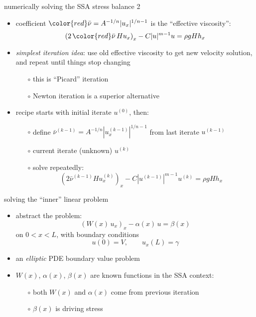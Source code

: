 \begin{frame}{numerically solving the SSA stress balance 2}

\begin{itemize}
\item coefficient ${\color{red} \bar \nu} = A^{-1/n} |u_x|^{1/n-1}$ is the ``effective viscosity'':
   $$\left(2 \,{\color{red} \bar \nu}\, H u_x\right)_x - C |u|^{m-1} u = \rho g H h_x$$

\medskip
\item \emph{simplest iteration idea}: use old effective viscosity to get new velocity solution, and repeat until things stop changing
  \begin{itemize}
  \item[$\circ$] this is ``Picard'' iteration
  \item[$\circ$] Newton iteration is a superior alternative
  \end{itemize}

\bigskip
\item recipe starts with initial iterate $u^{(0)}$, then:
  \begin{itemize}
  \item[$\circ$] define $\bar \nu^{(k-1)} = A^{-1/n} |u^{(k-1)}_x|^{1/n-1}$ from last iterate $u^{(k-1)}$
  \item[$\circ$] current iterate (unknown) $u^{(k)}$
  \item[$\circ$] solve repeatedly:
     $$\left(2 \bar \nu^{(k-1)} H u^{(k)}_x\right)_x - C |u^{(k-1)}|^{m-1} u^{(k)} = \rho g H h_x$$
  \end{itemize}
\end{itemize}
\end{frame}


\begin{frame}{solving the ``inner'' linear problem}
\begin{itemize}
\item abstract the problem:
   $$\left(W(x)\, u_x\right)_x - \alpha(x)\, u = \beta(x)$$
on $0 < x < L$, with boundary conditions
   $$u(0) = V, \qquad  u_x(L) = \gamma$$
\item an \emph{elliptic} PDE boundary value problem
\item $W(x)$, $\alpha(x)$, $\beta(x)$ are known functions in the SSA context:
  \begin{itemize}
  \item[$\circ$] both $W(x)$ and $\alpha(x)$ come from previous iteration
  \item[$\circ$] $\beta(x)$ is driving stress
  \end{itemize}
\end{itemize}
\end{frame}


